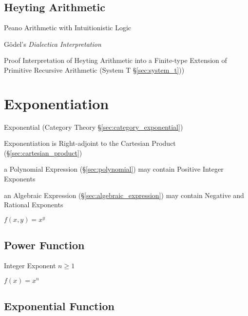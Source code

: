 \subsection{Heyting Arithmetic}\label{sec:heyting_arithmetic}

Peano Arithmetic with Intuitionistic Logic

G\"odel's \emph{Dialectica Interpretation}

Proof Interpretation of Heyting Arithmetic into a Finite-type Extension of
Primitive Recursive Arithmetic (System T \S\ref{sec:system_t}))



\section{Exponentiation}\label{sec:exponentiation}

\fist Exponential (Category Theory \S\ref{sec:category_exponential})

Exponentiation is Right-adjoint to the Cartesian Product
(\S\ref{sec:cartesian_product})

a Polynomial Expression (\S\ref{sec:polynomial}) may contain
Positive Integer Exponents

an Algebraic Expression (\S\ref{sec:algebraic_expression}) may contain Negative
and Rational Exponents

$f(x,y) = x^y$



\subsection{Power Function}\label{sec:power_function}

Integer Exponent $n \geq 1$

$f(x) = x^n$



\subsection{Exponential Function}\label{sec:exponential_function}

